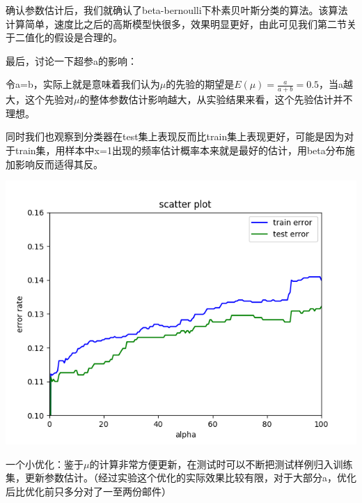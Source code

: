 \documentclass[hyperref,UTF8]{ctexart}
\begin{document}
\par
确认参数估计后，我们就确认了beta-bernoulli下朴素贝叶斯分类的算法。该算法计算简单，速度比之后的高斯模型快很多，效果明显更好，由此可见我们第二节关于二值化的假设是合理的。
\par
最后，讨论一下超参a的影响：
\par
令a=b，实际上就是意味着我们认为$\mu$的先验的期望是$E(\mu)=\frac{a}{a+b}=0.5$，当a越大，这个先验对$\mu$的整体参数估计影响越大，从实验结果来看，这个先验估计并不理想。
\par
同时我们也观察到分类器在test集上表现反而比train集上表现更好，可能是因为对于train集，用样本中x=1出现的频率估计概率本来就是最好的估计，用beta分布施加影响反而适得其反。
\\
\begin{table}[!htbp]
  \centering
\caption{不同$\alpha$下错误率}
\label{tb:lda_knn}
\end{table}

\includegraphics{alphaerror.png}

\par
一个小优化：鉴于$\mu$的计算非常方便更新，在测试时可以不断把测试样例归入训练集，更新参数估计。（经过实验这个优化的实际效果比较有限，对于大部分a，优化后比优化前只多分对了一至两份邮件）
\end{document}
